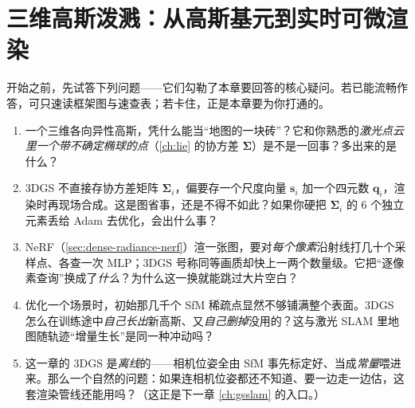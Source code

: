 \chapter{三维高斯泼溅：从高斯基元到实时可微渲染}
\label{ch:3dgs}


\begin{practice}[前置自测]
开始之前，先试答下列问题——它们勾勒了本章要回答的核心疑问。若已能流畅作答，可只速读框架图与速查表；若卡住，正是本章要为你打通的。
\begin{enumerate}
  \item 一个三维各向异性高斯，凭什么能当“地图的一块砖”？它和你熟悉的\emph{激光点云里一个带不确定椭球的点}（\cref{ch:lie} 的协方差 $\boldsymbol\Sigma$）是不是一回事？多出来的是什么？
  \item 3DGS 不直接存协方差矩阵 $\boldsymbol\Sigma_i$，偏要存一个尺度向量 $\mathbf s_i$ 加一个四元数 $\mathbf q_i$，渲染时再现场合成。这是图省事，还是不得不如此？如果你硬把 $\boldsymbol\Sigma_i$ 的 $6$ 个独立元素丢给 Adam 去优化，会出什么事？
  \item NeRF（\cref{sec:dense-radiance-nerf}）渲一张图，要对\emph{每个像素}沿射线打几十个采样点、各查一次 MLP；3DGS 号称同等画质却快上一两个数量级。它把“逐像素查询”换成了\emph{什么}？为什么这一换就能跳过大片空白？
  \item 优化一个场景时，初始那几千个 SfM 稀疏点显然不够铺满整个表面。3DGS 怎么在训练途中\emph{自己长出}新高斯、又\emph{自己删掉}没用的？这与激光 SLAM 里地图随轨迹“增量生长”是同一种冲动吗？
  \item 这一章的 3DGS 是\emph{离线}的——相机位姿全由 SfM 事先标定好、当成\emph{常量}喂进来。那么一个自然的问题：如果连相机位姿都还不知道、要一边走一边估，这套渲染管线还能用吗？（这正是下一章 \cref{ch:gsslam} 的入口。）
\end{enumerate}
\end{practice}

